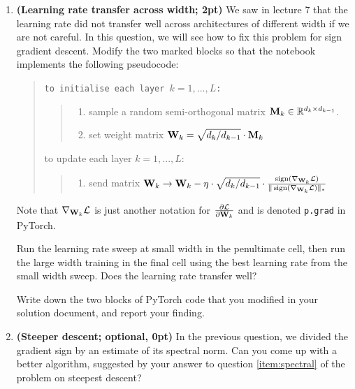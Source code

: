 \documentclass[12pt,letterpaper]{article}
\begin{document}
\begin{enumerate}
    \item \textbf{(Learning rate transfer across width; 2pt)} We saw in lecture 7 that the learning rate did not transfer well across architectures of different width if we are not careful. In this question, we will see how to fix this problem for sign gradient descent. Modify the two marked blocks so that the notebook implements the following pseudocode:
    \begin{quote}
    \tt to initialise each layer $k=1,...,L$:
    \begin{quote}
    \begin{enumerate}[label=(\roman*)]
        \item sample a random semi-orthogonal matrix ${\mathbf{M}}_k \in \mathbb{R}^{d_k \times d_{k-1}}$.
        \item set weight matrix ${\mathbf{W}}_k = \sqrt{d_k / d_{k-1}} \cdot {\mathbf{M}}_k$ 
    \end{enumerate}
    \end{quote}

    to update each layer $k=1,...,L$:
    \begin{quote}
    \begin{enumerate}[label=(\roman*)]
        \item send matrix ${\mathbf{W}}_k \rightarrow {\mathbf{W}}_k  - \eta \cdot \sqrt{d_k / d_{k-1}} \cdot \frac{\operatorname{sign}(\nabla_{{\mathbf{W}}_k} \mathcal{L})}{ \|\operatorname{sign}(\nabla_{{\mathbf{W}}_k} \mathcal{L})\|_*}$
    \end{enumerate}
    \end{quote}
    \normalfont
    \end{quote}
    Note that $\nabla_{{\mathbf{W}}_k} \mathcal{L}$ is just another notation for $\frac{\partial \mathcal{L}}{\partial {\mathbf{W}}_k}$ and is denoted \texttt{p.grad} in PyTorch.
    
    Run the learning rate sweep at small width in the penultimate cell, then run the large width training in the final cell using the best learning rate from the small width sweep. Does the learning rate transfer well?
    
    Write down the two blocks of PyTorch code that you modified in your solution document, and report your finding.

   

    \item{\textbf{(Steeper descent; optional, 0pt)}} In the previous question, we divided the gradient sign by an estimate of its spectral norm. Can you come up with a better algorithm, suggested by your answer to question \ref{item:spectral} of the problem on steepest descent?


\end{enumerate}
\end{document}
